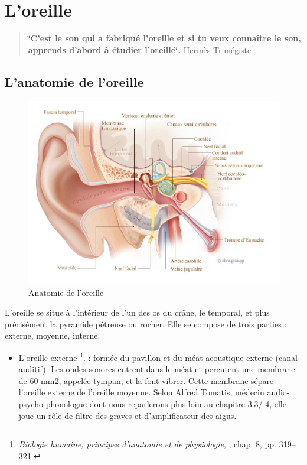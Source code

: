 \section{L'oreille}


\begin{quotation}
	\char`\"{}\textbf{C'est le son qui a fabriqué l'oreille et si tu veux connaître
		le son, apprends d'abord à étudier l\textquoteright oreille\char`\"{}.}
	Hermès Trimégiste
\end{quotation}

\subsection{L'anatomie de l'oreille}
\begin{figure}
	\centering
	\includegraphics[width=0.7\linewidth]{images/20160624Berufsfeldgruppen.jpg}
	\caption[Anatomie oreille]{Anatomie de l'oreille}
	\label{fig:-20160624berufsfeldgruppen}
\end{figure}

L'oreille\autocite[ch. 8 pp. 319--321]{marieb:biologie} 
se situe à l'intérieur de l'un des os du crâne, le temporal, et plus précisément la pyramide pétreuse ou rocher. Elle se compose de trois parties : externe, moyenne, interne.
\begin{itemize}
	\item  L'oreille externe \footnote{\textsl{Biologie humaine, principes d'anatomie et de physiologie}, \cite{marieb:biologie}, chap. 8, pp. 319--321.}.
	: formée du pavillon et du méat acoustique externe
	(canal auditif). Les ondes sonores entrent dans le méat et percutent
	une membrane de 60 mm2, appelée tympan, et la font vibrer. Cette membrane
	sépare l'oreille externe de l'oreille moyenne. 
	Selon Alfred Tomatis, médecin audio-psycho-phonologue dont nous reparlerons plus loin au chapitre 3.3/ 4, elle
	joue un rôle de filtre des graves et d'amplificateur des aigus.
\end{itemize}



